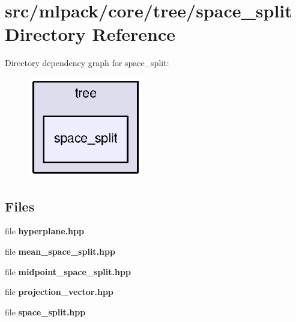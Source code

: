 \section{src/mlpack/core/tree/space\+\_\+split Directory Reference}
\label{dir_ed97a359292189f6ce70548f8cfe7fb7}
Directory dependency graph for space\+\_\+split\+:
\nopagebreak
\begin{figure}[H]
\begin{center}
\leavevmode
\includegraphics[width=142pt]{dir_ed97a359292189f6ce70548f8cfe7fb7_dep}
\end{center}
\end{figure}
\subsection*{Files}
\begin{DoxyCompactItemize}
\item 
file {\bf hyperplane.\+hpp}
\item 
file {\bf mean\+\_\+space\+\_\+split.\+hpp}
\item 
file {\bf midpoint\+\_\+space\+\_\+split.\+hpp}
\item 
file {\bf projection\+\_\+vector.\+hpp}
\item 
file {\bf space\+\_\+split.\+hpp}
\end{DoxyCompactItemize}
